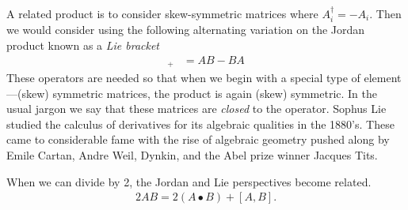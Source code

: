A related product is to consider 
skew-symmetric matrices where $A_i^{\dagger}=-A_i$.  Then we would consider using the following 
alternating variation on the Jordan product known as a \emph{Lie bracket}
\begin{align*}
    [A,B]_+ & = AB-BA
\end{align*}
These operators are needed so that when we begin with a special type of
element---(skew) symmetric matrices, the product is again (skew) symmetric.
In the usual jargon we say that these matrices are \emph{closed} to the operator.
Sophus Lie studied the calculus of derivatives for its algebraic 
qualities in the 1880's.  These came to considerable fame with the rise of algebraic 
geometry pushed along by Emile Cartan, Andre Weil, Dynkin, and the Abel prize winner Jacques Tits. 

When we can divide by 2, the Jordan and Lie perspectives become related.
\begin{align*}
    2AB = 2(A\bullet B)+[A,B].
\end{align*}